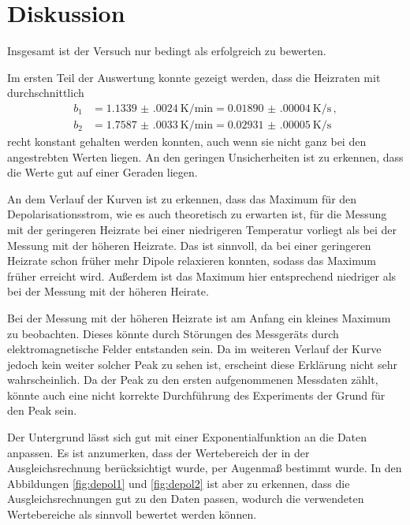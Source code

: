 \newpage
\section{Diskussion}
\label{sec:Diskussion}

Insgesamt ist der Versuch nur bedingt als erfolgreich zu bewerten.

Im ersten Teil der Auswertung konnte gezeigt werden, dass die Heizraten mit
durchschnittlich
\begin{align*}
  b_1&=\SI{1.1339(0024)}{\kelvin\per\minute}= \SI{0.01890(00004)}{\kelvin\per\second}\,, \\
  b_2&=\SI{1.7587(0033)}{\kelvin\per\minute}= \SI{0.02931(00005)}{\kelvin\per\second}\,
\end{align*}
recht konstant gehalten werden konnten, auch wenn sie nicht ganz bei den angestrebten
Werten liegen. An den geringen Unsicherheiten ist zu erkennen, dass die Werte gut auf einer
Geraden liegen.

An dem Verlauf der Kurven ist zu erkennen, dass das Maximum für den Depolarisationsstrom,
wie es auch theoretisch zu erwarten ist, für die Messung mit der geringeren Heizrate bei
einer niedrigeren Temperatur vorliegt als bei der Messung mit der höheren Heizrate. Das ist
sinnvoll, da bei einer geringeren Heizrate schon früher mehr Dipole relaxieren konnten, sodass
das Maximum früher erreicht wird. Außerdem ist das Maximum hier entsprechend niedriger als
bei der Messung mit der höheren Heirate.

Bei der Messung mit der höheren Heizrate ist am Anfang ein kleines Maximum zu
beobachten. Dieses könnte durch Störungen des Messgeräts durch elektromagnetische Felder
entstanden sein. Da im weiteren Verlauf der Kurve jedoch kein weiter solcher Peak
zu sehen ist, erscheint diese Erklärung nicht sehr wahrscheinlich. Da der Peak zu den
ersten aufgenommenen Messdaten zählt, könnte auch eine nicht korrekte Durchführung des
Experiments der Grund für den Peak sein.

Der Untergrund lässt sich gut mit einer Exponentialfunktion an die Daten anpassen.
Es ist anzumerken, dass der Wertebereich der in der Ausgleichsrechnung berücksichtigt wurde,
per Augenmaß bestimmt wurde. In den
Abbildungen \ref{fig:depol1} und \ref{fig:depol2} ist aber zu erkennen, dass die Ausgleichsrechnungen
gut zu den Daten passen, wodurch die verwendeten Wertebereiche als sinnvoll bewertet werden können.

